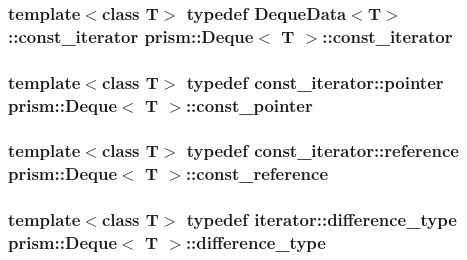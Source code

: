 \subsubsection[{\texorpdfstring{const\+\_\+iterator}{const_iterator}}]{\setlength{\rightskip}{0pt plus 5cm}template$<$class T$>$ typedef Deque\+Data$<$T$>$\+::{\bf const\+\_\+iterator} {\bf prism\+::\+Deque}$<$ T $>$\+::{\bf const\+\_\+iterator}}\hypertarget{classprism_1_1_deque_afc2f71fd5b01e963e093f64cc4da94ec}{}\label{classprism_1_1_deque_afc2f71fd5b01e963e093f64cc4da94ec}
\subsubsection[{\texorpdfstring{const\+\_\+pointer}{const_pointer}}]{\setlength{\rightskip}{0pt plus 5cm}template$<$class T$>$ typedef const\+\_\+iterator\+::pointer {\bf prism\+::\+Deque}$<$ T $>$\+::{\bf const\+\_\+pointer}}\hypertarget{classprism_1_1_deque_a4c43189271514578fda69c968b1d4e3c}{}\label{classprism_1_1_deque_a4c43189271514578fda69c968b1d4e3c}
\subsubsection[{\texorpdfstring{const\+\_\+reference}{const_reference}}]{\setlength{\rightskip}{0pt plus 5cm}template$<$class T$>$ typedef const\+\_\+iterator\+::reference {\bf prism\+::\+Deque}$<$ T $>$\+::{\bf const\+\_\+reference}}\hypertarget{classprism_1_1_deque_a8fcabfe6976606b91b4abef0e0353584}{}\label{classprism_1_1_deque_a8fcabfe6976606b91b4abef0e0353584}
\subsubsection[{\texorpdfstring{difference\+\_\+type}{difference_type}}]{\setlength{\rightskip}{0pt plus 5cm}template$<$class T$>$ typedef iterator\+::difference\+\_\+type {\bf prism\+::\+Deque}$<$ T $>$\+::{\bf difference\+\_\+type}}\hypertarget{classprism_1_1_deque_a2639a05f15b2d1748258ceb9f6e5c8c3}{}\label{classprism_1_1_deque_a2639a05f15b2d1748258ceb9f6e5c8c3}
